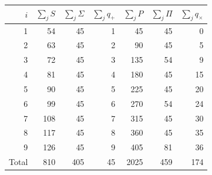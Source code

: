 \begin{tablacompleta}[htbp]
\caption{Evaluaciones acumuladas por fila del soporte APP.}
\label{tab:app-totales_filas}
\begin{tabular}{r*{6}{r}}
\toprule
$i$ & $\sum_j S$ & $\sum_j\Sigma$ & $\sum_j q_+$ & $\sum_j P$ & $\sum_j\Pi$ & $\sum_j q_\times$ \\
\midrule
1 & 54 & 45 & 1 & 45 & 45 & 0 \\
2 & 63 & 45 & 2 & 90 & 45 & 5 \\
3 & 72 & 45 & 3 & 135 & 54 & 9 \\
4 & 81 & 45 & 4 & 180 & 45 & 15 \\
5 & 90 & 45 & 5 & 225 & 45 & 20 \\
6 & 99 & 45 & 6 & 270 & 54 & 24 \\
7 & 108 & 45 & 7 & 315 & 45 & 30 \\
8 & 117 & 45 & 8 & 360 & 45 & 35 \\
9 & 126 & 45 & 9 & 405 & 81 & 36 \\
\midrule
Total & 810 & 405 & 45 & 2025 & 459 & 174 \\
\bottomrule
\end{tabular}
\end{tablacompleta}
